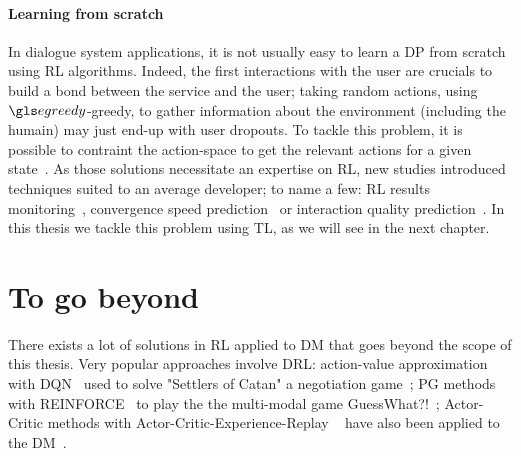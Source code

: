 \paragraph{Learning from scratch}

In dialogue system applications, it is not usually easy to learn a \gls{DP} from scratch using  \gls{RL} algorithms. Indeed, the first interactions with the user are crucials to build a bond between the service and the user; taking random actions, using $\egreedy$-greedy, to gather information about the environment (including the humain) may just end-up with user dropouts. To tackle this problem, it is possible to contraint the action-space to get the relevant actions for a given state~\parencite{singh2002,williams2008,laroche2009,laroche2010a}. As those solutions necessitate an expertise on \gls{RL}, new studies introduced techniques suited to an average developer; to name a few: \gls{RL} results monitoring~\parencite{laroche2010b}, convergence speed prediction~\parencite{elasri2013} or interaction quality prediction~\parencite{elasri2014}. In this thesis we tackle this problem using \acrfull{TL}, as we will see in the next chapter.

\section{To go beyond}

There exists a lot of solutions in \gls{RL} applied to \gls{DM} that goes beyond the scope of this thesis. Very popular approaches involve \acrfull{DRL}: action-value approximation with \gls{DQN}~\parencite{Mnih2015} used to solve "Settlers of Catan" a negotiation game~\parencite{Cuayhuitl2015StrategicDM}; \gls{PG} methods with REINFORCE~\parencite{Williams1992:REINFORCE} to play the the multi-modal game GuessWhat?!~\parencite{Vries2017-GuessWhat}; Actor-Critic methods with Actor-Critic-Experience-Replay ~\parencite{Wang2016-ACER} have also been applied to the \gls{DM}~\parencite{Weisz2018-ac-rl}.

